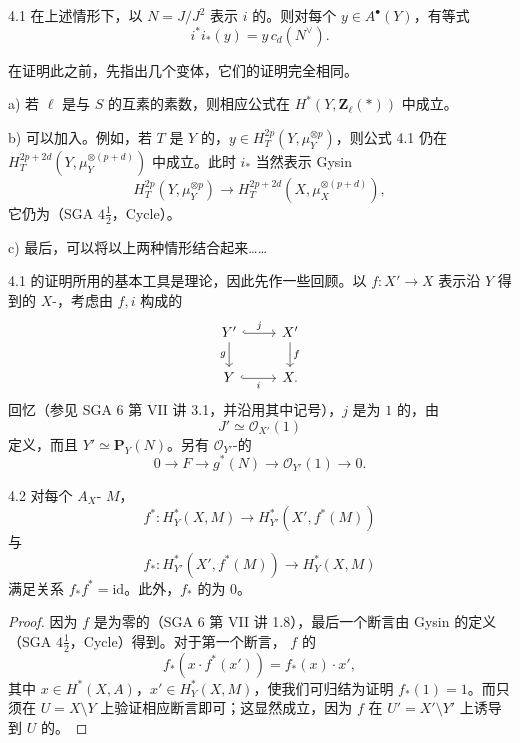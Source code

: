 \begin{SGAresult}{}{4.1}
在上述情形下，以 $N=J/J^2$ 表示 $i$ 的。则对每个 $y\in A^\bullet(Y)$，有等式
\[
 i^*i_*(y)=y\,c_d(N^\vee).
\]
\end{SGAresult}
在证明此之前，先指出几个变体，它们的证明完全相同。

a) 若 $\ell$ 是与 $S$ 的互素的素数，则相应公式在 $H^*(Y,\mathbf Z_\ell(*))$ 中成立。

b) 可以加入。例如，若 $T$ 是 $Y$ 的，$y\in H_T^{2p}(Y,\mu_Y^{\otimes p})$，则公式 4.1 仍在 $H_T^{2p+2d}(Y,\mu_Y^{\otimes(p+d)})$ 中成立。此时 $i_*$ 当然表示 Gysin 
\[
 H_T^{2p}(Y,\mu_Y^{\otimes p})\longrightarrow H_T^{2p+2d}(X,\mu_X^{\otimes(p+d)}),
\]
它仍为（SGA $4\frac12$，Cycle）。

c) 最后，可以将以上两种情形结合起来……

4.1 的证明所用的基本工具是理论，因此先作一些回顾。以 $f:X'\to X$ 表示沿 $Y$ 得到的 $X$-，考虑由 $f,i$ 构成的
\[
\begin{tikzcd}
 Y' \arrow[r,hook,"j"] \arrow[d,"g"'] & X' \arrow[d,"f"]\\
 Y \arrow[r,hook,"i"'] & X.
\end{tikzcd}
\]
回忆（参见 SGA 6 第 VII 讲 3.1，并沿用其中记号），$j$ 是为 $1$ 的，由
\[
 J'\simeq\mathscr O_{X'}(1)
\]
定义，而且 $Y'\simeq\mathbf P_Y(N)$。另有 $\mathscr O_{Y'}$-的
\[
 0\longrightarrow F\longrightarrow g^*(N)\longrightarrow\mathscr O_{Y'}(1)\longrightarrow0.
\]

\begin{SGAresult}{}{4.2}
对每个 $A_X$- $M$，
\[
 f^*:H_Y^*(X,M)\longrightarrow H_{Y'}^*(X',f^*(M))
\]
与
\[
 f_*:H_{Y'}^*(X',f^*(M))\longrightarrow H_Y^*(X,M)
\]
满足关系 $f_*f^*=\mathrm{id}$。此外，$f_*$ 的为 $0$。
\end{SGAresult}
\begin{proof}
因为 $f$ 是为零的（SGA 6 第 VII 讲 1.8），最后一个断言由 Gysin 的定义（SGA $4\frac12$，Cycle）得到。对于第一个断言， $f$ 的
\[
 f_*(x\cdot f^*(x'))=f_*(x)\cdot x',
\]
其中 $x\in H^*(X,A)$，$x'\in H_Y^*(X,M)$，使我们可归结为证明 $f_*(1)=1$。而只须在 $U=X\setminus Y$ 上验证相应断言即可；这显然成立，因为 $f$ 在 $U'=X'\setminus Y'$ 上诱导到 $U$ 的。
\end{proof}

